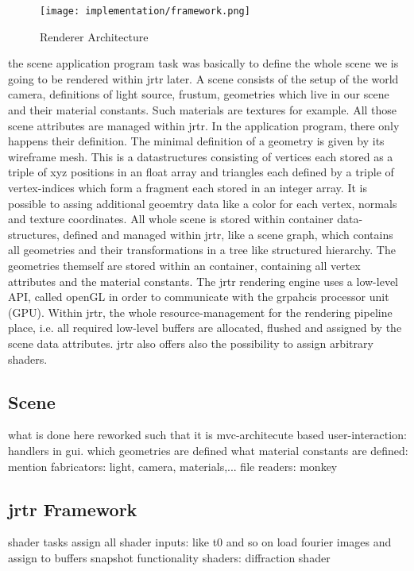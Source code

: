 \begin{figure}[ht]
  \centering
  \texttt{[image: implementation/framework.png]}
  \label{rendererArchitecture}
  \caption{Renderer Architecture}
\end{figure}

the scene application program task was basically to define the whole scene we is going to be rendered within jrtr later.
A scene consists of the setup of the world camera, definitions of light source, frustum, geometries which live in our scene and their material constants. Such materials are textures for example. All those scene attributes are managed within jrtr. In the application program, there only happens their definition.
The minimal definition of a geometry is given by its wireframe mesh. This is a datastructures consisting of vertices each stored as a triple of xyz positions in an float array and triangles each defined by a triple of vertex-indices which form a fragment each stored in an integer array. It is possible to assing additional geoemtry data like a color for each vertex, normals and texture coordinates.
All whole scene is stored within container data-structures, defined and managed within jrtr, like a scene graph, which contains all geometries and their transformations in a tree like structured hierarchy. The geometries themself are stored within an container, containing all vertex attributes and the material constants.
The jrtr rendering engine uses a low-level API, called openGL in order to communicate with the grpahcis processor unit (GPU). Within jrtr, the whole resource-management for the rendering pipeline place, i.e. all required low-level buffers are allocated, flushed and assigned by the scene data attributes. jrtr also offers also the possibility to assign arbitrary shaders.
   
\subsection{Scene}
what is done here 
reworked such that it is mvc-architecute based
user-interaction: handlers in gui.
which geometries are defined
what material constants are defined: mention fabricators: light, camera, materials,...
file readers: monkey

\subsection{jrtr Framework}
shader tasks
assign all shader inputs: like t0 and so on
load fourier images and assign to buffers
snapshot functionality
shaders: diffraction shader


